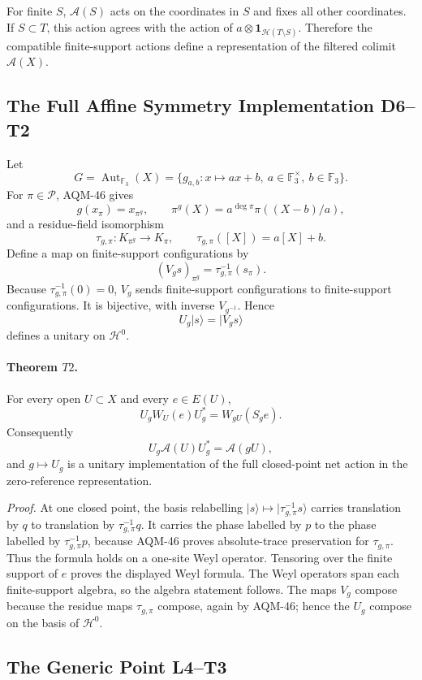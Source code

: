 For finite \(S\), \(\mathcal A(S)\) acts on the coordinates in \(S\) and fixes
all other coordinates.  If \(S\subset T\), this action agrees with the action
of \(a\otimes\mathbf 1_{\mathcal H(T\setminus S)}\).  Therefore the compatible
finite-support actions define a representation of the filtered colimit
\(\mathcal A(X)\).

\subsection{The Full Affine Symmetry Implementation D6--T2}
Let
\[
  G=\operatorname{Aut}_{\mathbb F_3}(X)
   =\{g_{a,b}:x\mapsto ax+b,\ a\in\mathbb F_3^\times,\ b\in\mathbb F_3\}.
\]
For \(\pi\in\mathcal P\), AQM-46 gives
\[
  g(x_\pi)=x_{\pi^g},\qquad
  \pi^g(X)=a^{\deg\pi}\pi((X-b)/a),
\]
and a residue-field isomorphism
\[
  \tau_{g,\pi}:K_{\pi^g}\to K_\pi,\qquad
  \tau_{g,\pi}([X])=a[X]+b.
\]
Define a map on finite-support configurations by
\[
  (V_gs)_{\pi^g}=\tau_{g,\pi}^{-1}(s_\pi).
\]
Because \(\tau_{g,\pi}^{-1}(0)=0\), \(V_g\) sends finite-support configurations
to finite-support configurations.  It is bijective, with inverse
\(V_{g^{-1}}\).  Hence
\[
  U_g|s\rangle=|V_gs\rangle
\]
defines a unitary on \(\mathcal H^0\).

\paragraph{Theorem \(T2\).}
For every open \(U\subset X\) and every \(e\in E(U)\),
\[
  U_gW_U(e)U_g^*=W_{gU}(S_ge).
\]
Consequently
\[
  U_g\mathcal A(U)U_g^*=\mathcal A(gU),
\]
and \(g\mapsto U_g\) is a unitary implementation of the full closed-point
net action in the zero-reference representation.

\emph{Proof.}
At one closed point, the basis relabelling
\(|s\rangle\mapsto|\tau_{g,\pi}^{-1}s\rangle\) carries translation by \(q\) to
translation by \(\tau_{g,\pi}^{-1}q\).  It carries the phase labelled by \(p\)
to the phase labelled by \(\tau_{g,\pi}^{-1}p\), because AQM-46 proves
absolute-trace preservation for \(\tau_{g,\pi}\).  Thus the formula holds on a
one-site Weyl operator.  Tensoring over the finite support of \(e\) proves the
displayed Weyl formula.  The Weyl operators span each finite-support algebra,
so the algebra statement follows.  The maps \(V_g\) compose because the residue
maps \(\tau_{g,\pi}\) compose, again by AQM-46; hence the \(U_g\) compose on the
basis of \(\mathcal H^0\).

\subsection{The Generic Point L4--T3}
